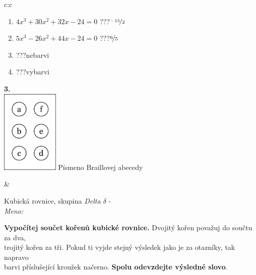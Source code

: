 \documentclass[10pt]{report}
\begin{document}
\begin{tabular}{c:c}
\begin{minipage}[c][104.5mm][t]{0.5\linewidth}
\begin{center}
\begin{minipage}{0.79\linewidth}
\begin{center}
\begin{varwidth}{\linewidth}
\begin{enumerate}
\item $4x^3+30x^2+32x-24=0$\quad \dotfill\; ???\;\dotfill \quad $\nicefrac{-15}{2}$
\item $5x^3-26x^2+44x-24=0$\quad \dotfill\; ???\;\dotfill \quad $\nicefrac{6}{5}$
\item \quad \dotfill\; ???\;\dotfill \quad nebarvi
\item \quad \dotfill\; ???\;\dotfill \quad vybarvi
\end{enumerate}
\end{varwidth}
\end{center}
\end{minipage}
\begin{minipage}{0.20\linewidth}
\begin{center}
{\Huge\bfseries 3.} \\[2mm]
\includegraphics[height=40mm]{../images/braille.png}
{\small Písmeno Braillovej abecedy}
\end{center}
\end{minipage}
\end{center}
\end{minipage}
&
\begin{minipage}[c][104.5mm][t]{0.5\linewidth}
\begin{center}
\vspace{7mm}
{\huge Kubická rovnice, skupina \textit{Delta $\delta$} -}\\[5mm]
\textit{Meno:}\phantom{xxxxxxxxxxxxxxxxxxxxxxxxxxxxxxxxxxxxxxxxxxxxxxxxxxxxxxxxxxxxxxxxx}\\[5mm]
\begin{minipage}{0.95\linewidth}
\textbf{Vypočítej součet kořenů kubické rovnice.} Dvojitý kořen považuj do součtu za dva,\\trojitý kořen za tři. Pokud ti vyjde stejný výsledek jako je za otazníky, tak napravo\\barvi příslušející kroužek načerno. \textbf{Spolu odevzdejte výsledné slovo}.
\end{minipage}
\\[1mm]
\begin{minipage}{0.79\linewidth}

\end{minipage}
\end{center}
\end{minipage}
\end{tabular}
\end{document}
